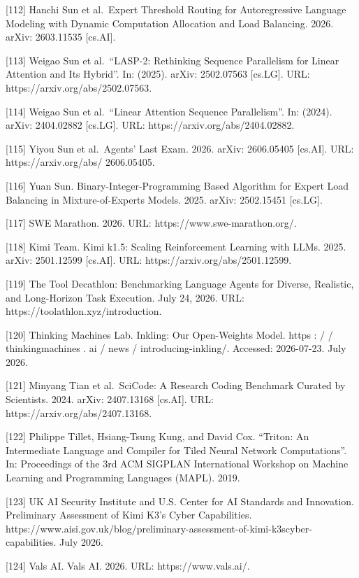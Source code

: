 {[}112{]} Hanchi Sun et al.~Expert Threshold Routing for Autoregressive
Language Modeling with Dynamic Computation Allocation and Load
Balancing. 2026. arXiv: 2603.11535 {[}cs.AI{]}.

{[}113{]} Weigao Sun et al.~``LASP-2: Rethinking Sequence Parallelism
for Linear Attention and Its Hybrid''. In: (2025). arXiv: 2502.07563
{[}cs.LG{]}. URL: https://arxiv.org/abs/2502.07563.

{[}114{]} Weigao Sun et al.~``Linear Attention Sequence Parallelism''.
In: (2024). arXiv: 2404.02882 {[}cs.LG{]}. URL:
https://arxiv.org/abs/2404.02882.

{[}115{]} Yiyou Sun et al.~Agents' Last Exam. 2026. arXiv: 2606.05405
{[}cs.AI{]}. URL: https://arxiv.org/abs/ 2606.05405.

{[}116{]} Yuan Sun. Binary-Integer-Programming Based Algorithm for
Expert Load Balancing in Mixture-of-Experts Models. 2025. arXiv:
2502.15451 {[}cs.LG{]}.

{[}117{]} SWE Marathon. 2026. URL: https://www.swe-marathon.org/.

{[}118{]} Kimi Team. Kimi k1.5: Scaling Reinforcement Learning with
LLMs. 2025. arXiv: 2501.12599 {[}cs.AI{]}. URL:
https://arxiv.org/abs/2501.12599.

{[}119{]} The Tool Decathlon: Benchmarking Language Agents for Diverse,
Realistic, and Long-Horizon Task Execution. July 24, 2026. URL:
https://toolathlon.xyz/introduction.

{[}120{]} Thinking Machines Lab. Inkling: Our Open-Weights Model. https
: / / thinkingmachines . ai / news / introducing-inkling/. Accessed:
2026-07-23. July 2026.

{[}121{]} Minyang Tian et al.~SciCode: A Research Coding Benchmark
Curated by Scientists. 2024. arXiv: 2407.13168 {[}cs.AI{]}. URL:
https://arxiv.org/abs/2407.13168.

{[}122{]} Philippe Tillet, Hsiang-Tsung Kung, and David Cox. ``Triton:
An Intermediate Language and Compiler for Tiled Neural Network
Computations''. In: Proceedings of the 3rd ACM SIGPLAN International
Workshop on Machine Learning and Programming Languages (MAPL). 2019.

{[}123{]} UK AI Security Institute and U.S. Center for AI Standards and
Innovation. Preliminary Assessment of Kimi K3's Cyber Capabilities.
https://www.aisi.gov.uk/blog/preliminary-assessment-of-kimi-k3scyber-capabilities.
July 2026.

{[}124{]} Vals AI. Vals AI. 2026. URL: https://www.vals.ai/.

